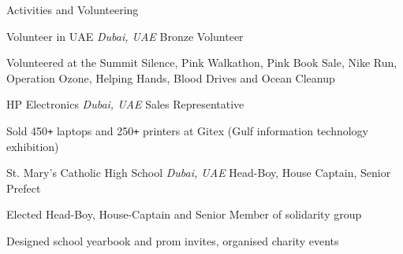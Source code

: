 \documentclass{resume} %
\begin{document}
\begin{rSection}{Activities and Volunteering}
  \begin{rSubsection}{Volunteer in UAE}
                     {\em Dubai, UAE}
                     {Bronze Volunteer}
                     {}
    \item Volunteered at the Summit Silence, Pink Walkathon, Pink Book Sale, Nike
	    Run, Operation Ozone, Helping Hands, Blood Drives and Ocean Cleanup
  \end{rSubsection}

  \begin{rSubsection}{HP Electronics}
                     {\em Dubai, UAE}
                     {Sales Representative}
                     {}
	     \item Sold 450\texttt{+} laptops and 250\texttt{+} printers at
		     Gitex (Gulf information technology exhibition)
  \end{rSubsection}

  \begin{rSubsection}{St. Mary's Catholic High School}
                     {\em Dubai, UAE}
                     {Head-Boy, House Captain, Senior Prefect}
                     {}
 
  \item Elected Head-Boy, House-Captain and Senior Member of solidarity
	  group
  \item Designed school yearbook and prom invites, organised charity
	  events
	  
  \end{rSubsection}
\end{rSection}
\end{document}
